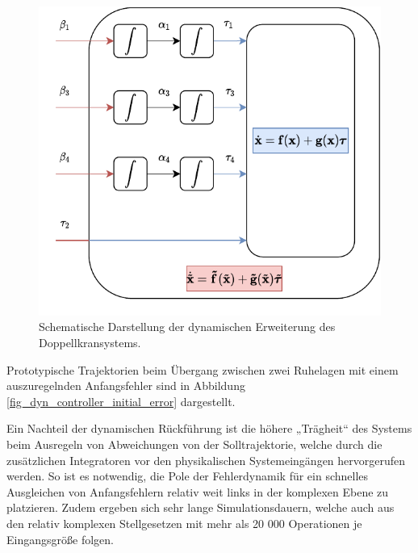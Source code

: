 \begin{figure}[ht]
	\begin{center}
		\includegraphics[scale=1]{Pictures/dynamic_extension}
	\end{center}
	\caption[Schematische Darstellung dynamischer Erweiterung des Doppellkransystems]
	{Schematische Darstellung der dynamischen Erweiterung des Doppellkransystems.}
	\label{fig:dynamic_extension_diagram}
\end{figure}

Prototypische Trajektorien beim Übergang zwischen zwei Ruhelagen mit einem auszuregelnden Anfangsfehler sind in Abbildung \ref{fig_dyn_controller_initial_error} dargestellt.

Ein Nachteil der dynamischen Rückführung ist die höhere „Trägheit“ des Systems beim Ausregeln von Abweichungen von der Solltrajektorie, welche durch die zusätzlichen Integratoren vor den physikalischen Systemeingängen hervorgerufen werden. So ist es notwendig, die Pole der Fehlerdynamik für ein schnelles Ausgleichen von Anfangsfehlern relativ weit links in der komplexen Ebene zu platzieren. Zudem ergeben sich sehr lange Simulationsdauern, welche auch aus den relativ komplexen Stellgesetzen mit mehr als 20 000 Operationen je Eingangsgröße folgen. 

